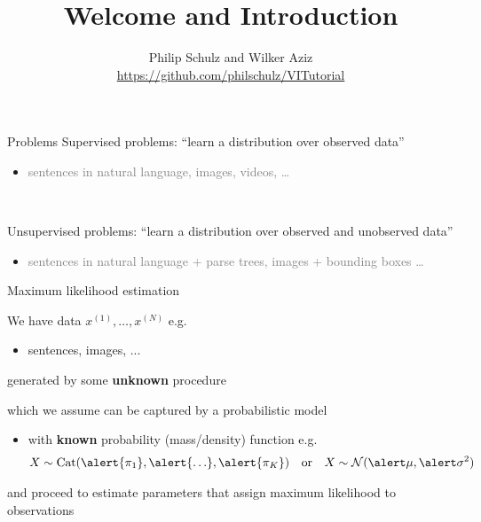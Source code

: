 \documentclass[14pt]{beamer}
\title{Welcome and Introduction}
\date{}
\author[Schulz and Aziz]{Philip Schulz and Wilker Aziz \\
\url{https://github.com/philschulz/VITutorial}}
\begin{document}
\frame{\titlepage}

\begin{frame}{Problems}
Supervised problems: \alert{``learn a distribution over observed data''}
\begin{itemize}
	\item \textcolor{gray}{sentences in natural language, images, videos, \ldots}
\end{itemize}

~

Unsupervised problems: \alert{``learn a distribution over observed and unobserved data''}
\begin{itemize}
	\item \textcolor{gray}{sentences in natural language + parse trees, images + bounding boxes \ldots}
\end{itemize}
\end{frame}



\begin{frame}{Maximum likelihood estimation}

\small

We have data $x^{(1)}, \ldots, x^{(N)}$ e.g.  \\
\begin{itemize}
	\item sentences, images, ...
\end{itemize}
generated by some {\bf unknown} procedure

\pause

which we assume can be captured by a probabilistic model

\pause

\begin{itemize}
	\item with {\bf known} probability (mass/density) function e.g.
	\begin{align*}
    X \sim \Cat(\alert{\pi_1}, \alert{\ldots}, \alert{\pi_K}) & & \text{or} & & X \sim \mathcal N(\alert\mu, \alert\sigma^2)
    \end{align*}    
\end{itemize}
and proceed to \alert{estimate parameters} that assign maximum likelihood to observations

\end{frame}
\end{document}
